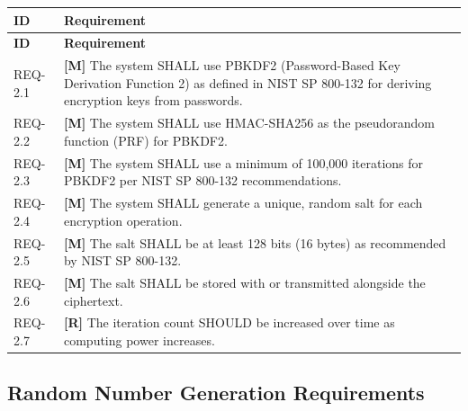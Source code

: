 \documentclass[11pt,letterpaper]{article}
\begin{document}
\begin{longtable}{@{}p{1.2cm}p{12cm}@{}}
\toprule
\textbf{ID} & \textbf{Requirement} \\
\midrule
\endfirsthead
\toprule
\textbf{ID} & \textbf{Requirement} \\
\midrule
\endhead

REQ-2.1 & \textcolor{mandatory}{\textbf{[M]}} The system SHALL use PBKDF2 (Password-Based Key Derivation Function 2) as defined in NIST SP 800-132 for deriving encryption keys from passwords. \\[6pt]

REQ-2.2 & \textcolor{mandatory}{\textbf{[M]}} The system SHALL use HMAC-SHA256 as the pseudorandom function (PRF) for PBKDF2. \\[6pt]

REQ-2.3 & \textcolor{mandatory}{\textbf{[M]}} The system SHALL use a minimum of 100,000 iterations for PBKDF2 per NIST SP 800-132 recommendations. \\[6pt]

REQ-2.4 & \textcolor{mandatory}{\textbf{[M]}} The system SHALL generate a unique, random salt for each encryption operation. \\[6pt]

REQ-2.5 & \textcolor{mandatory}{\textbf{[M]}} The salt SHALL be at least 128 bits (16 bytes) as recommended by NIST SP 800-132. \\[6pt]

REQ-2.6 & \textcolor{mandatory}{\textbf{[M]}} The salt SHALL be stored with or transmitted alongside the ciphertext. \\[6pt]

REQ-2.7 & \textcolor{recommended}{\textbf{[R]}} The iteration count SHOULD be increased over time as computing power increases. \\[6pt]

\bottomrule
\end{longtable}

\subsection{Random Number Generation Requirements}
\end{document}

